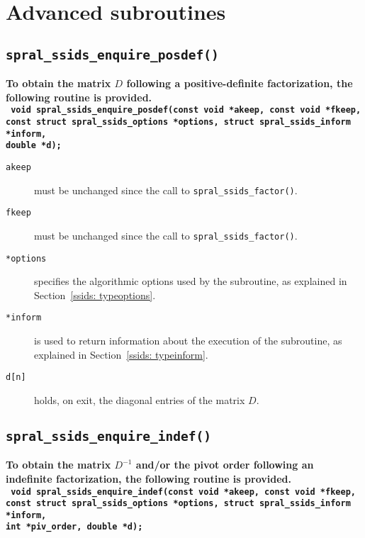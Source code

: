\section{Advanced subroutines}


\subsection{\texttt{spral\_ssids\_enquire\_posdef()}}
\textbf{To obtain the matrix $D$ following a positive-definite factorization, the following routine is provided.
   \vspace*{0.1cm} \\
   \texttt{
      \hspace*{0.2cm} void spral\_ssids\_enquire\_posdef(const void *akeep, const void *fkeep, \\
      \hspace*{0.7cm} const struct spral\_ssids\_options *options,
         struct spral\_ssids\_inform *inform, \\
      \hspace*{0.7cm} double *d);
   }
}

\begin{description}

\item[\texttt{akeep}] must be unchanged since the call to
   {\tt spral\_ssids\_factor()}.

\item[\texttt{fkeep}] must be unchanged since the call to
   {\tt spral\_ssids\_factor()}.

\item[\texttt{*options}] specifies the algorithmic options used by the
   subroutine, as explained in Section~\ref{ssids: typeoptions}.

\item[\texttt{*inform}] is used to return information about the execution
   of the subroutine, as explained in Section~\ref{ssids: typeinform}.

\item[\texttt{d[n]}] holds, on exit, the diagonal entries of the matrix $D$.

\end{description}

\subsection{\texttt{spral\_ssids\_enquire\_indef()}}
\textbf{To obtain the matrix $D^{-1}$ and/or the pivot order following an
   indefinite factorization, the following routine is provided.
   \vspace*{0.1cm} \\
   \texttt{
      \hspace*{0.2cm} void spral\_ssids\_enquire\_indef(const void *akeep, const void *fkeep, \\
      \hspace*{0.7cm} const struct spral\_ssids\_options *options,
         struct spral\_ssids\_inform *inform, \\
      \hspace*{0.7cm} int *piv\_order, double *d);
   }
}

